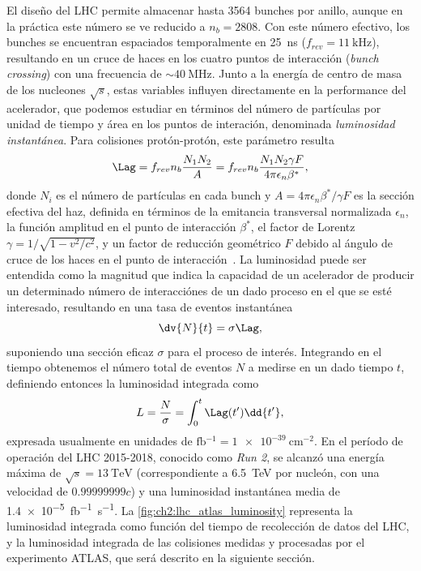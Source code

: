 El diseño del LHC permite almacenar hasta 3564 bunches por anillo, aunque en la práctica este número se ve reducido a $n_b = 2808$. Con este número efectivo, los bunches se encuentran espaciados temporalmente en \SI{25}{\nano\second} ($f_{rev} = \SI{11}{\kilo\hertz}$), resultando en un cruce de haces en los cuatro puntos de interacción (\textit{bunch crossing}) con una frecuencia de $\sim\SI{40}{\mega\hertz}$. Junto a la energía de centro de masa de los nucleones $\sqrt{s}$, estas variables influyen directamente en la performance del acelerador, que podemos estudiar en términos del número de partículas por unidad de tiempo y área en los puntos de interación, denominada \textit{luminosidad instantánea}. Para colisiones protón-protón, este parámetro resulta
\[ \Lag = f_{rev} n_b \frac{N_1 N_2}{A} = f_{rev} n_b \frac{N_1 N_2 \gamma F}{4 \pi \epsilon_n \beta^*}, \]
donde $N_i$ es el número de partículas en cada bunch y $A = 4\pi\epsilon_n \beta^* / \gamma F$ es la sección efectiva del haz, definida en términos de la emitancia transversal normalizada $\epsilon_n$, la función amplitud en el punto de interacción $\beta^*$, el factor de Lorentz $\gamma = 1/\sqrt{1-v^2/c^2}$, y un factor de reducción geométrico $F$ debido al ángulo de cruce de los haces en el punto de interacción~\cite{Lee2019}. La luminosidad puede ser entendida como la magnitud que indica la capacidad de un acelerador de producir un determinado número de interacciónes de un dado proceso en el que se esté interesado, resultando en una tasa de eventos instantánea
\[ \dv{N}{t} = \sigma \Lag, \]
suponiendo una sección eficaz $\sigma$ para el proceso de interés. Integrando en el tiempo obtenemos el número total de eventos $N$ a medirse en un dado tiempo $t$, definiendo entonces la luminosidad integrada como
\[ L = \frac{N}{\sigma} = \int_0^t \Lag(t') \dd{t'}, \]
expresada usualmente en unidades de $\si{\femto\barn^{-1}} = \SI{1e-39}{\centi\meter^{-2}}$. En el período de operación del LHC 2015-2018, conocido como \textit{Run 2}, se alcanzó una energía máxima de $\sqrt{s} = \SI{13}{\TeV}$ (correspondiente a \SI{6.5}{\TeV} por nucleón, con una velocidad de $0.99999999c$) y una luminosidad instantánea media de \SI{1.4e-5}{\femto\barn^{-1} \second^{-1}}. La \cref{fig:ch2:lhc_atlas_luminosity} representa la luminosidad integrada como función del tiempo de recolección de datos del LHC, y la luminosidad integrada de las colisiones medidas y procesadas por el experimento ATLAS, que será descrito en la siguiente sección.


